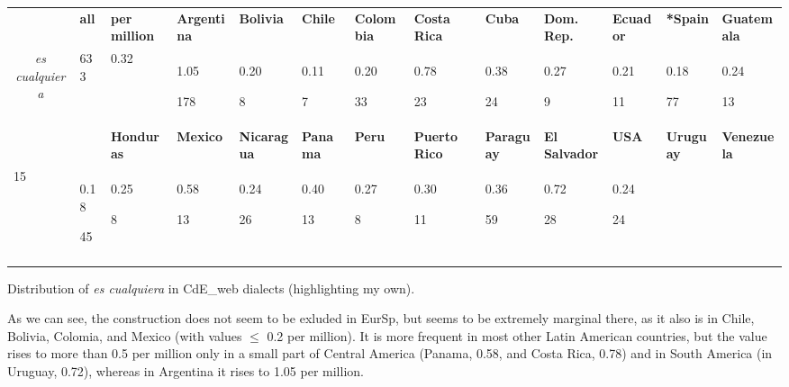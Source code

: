 \begin{table}
\begin{tabularx}{\textwidth}{XXXXXXXXXXXXX}
\lsptoprule
\multicolumn{1}{c}{\textbf{context}} & \textbf{all} & \textbf{per} \textbf{million} & \textbf{Argentina} & \textbf{Bolivia} & \textbf{Chile} & \textbf{Colombia} & \textbf{Costa} \textbf{Rica} & \textbf{Cuba} & \textbf{Dom.} \textbf{Rep.} & \textbf{Ecuador} & \textbf{*Spain} & \textbf{Guatemala}\\
\multicolumn{1}{c}{ \textit{es cualquiera}} & 633 & 0.32 & { 1.05}

 178 & { 0.20}

 8 & { 0.11}

 7 & { 0.20}

 33 & { 0.78}

 23 & { 0.38}

 24 & { 0.27}

 9 & { 0.21}

 11 & { 0.18}

 77 & { 0.24}

 13\\
&  & \textbf{Honduras} & \textbf{Mexico} & \textbf{Nicaragua} & \textbf{Panama} & \textbf{Peru} & \textbf{Puerto} \textbf{Rico} & \textbf{Paraguay} & \textbf{El} \textbf{Salvador} & \textbf{USA} & \textbf{Uruguay} & \textbf{Venezuela}\\

 15 & { 0.18}

 45 & { 0.25}

 8 & { 0.58}

 13 & { 0.24}

 26 & { 0.40}

 13 & { 0.27}

 8 & { 0.30}

 11 & { 0.36}

 59 & { 0.72}

 28 & { 0.24}

 24\\
\lspbottomrule
\end{tabularx}
\caption{\label{tab:} ~}Distribution of \textit{es cualquiera} in CdE\_web dialects (highlighting my own).
\end{table}

As we can see, the construction does not seem to be exluded in EurSp, but seems to be extremely marginal there, as it also is in Chile, Bolivia, Colomia, and Mexico (with values ${\leq}$ 0.2 per million). It is more frequent in most other Latin American countries, but the value rises to more than 0.5 per million only in a small part of Central America (Panama, 0.58, and Costa Rica, 0.78) and in South America (in Uruguay, 0.72), whereas in Argentina it rises to 1.05 per million.

